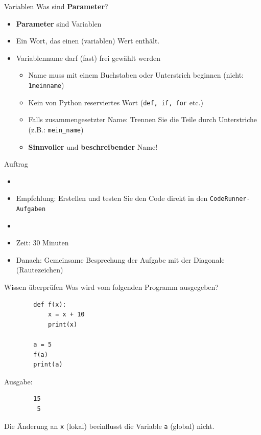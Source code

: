 \begin{frame}[fragile]{Variablen}
    Was sind \textbf{Parameter}?
    \begin{itemize}[<+->]
        \item \textbf{Parameter} sind Variablen
        \item Ein Wort, das einen  (variablen) Wert enthält.
        \item Variablenname darf (fast) frei gewählt werden
              \begin{itemize}
                  \item Name muss mit einem Buchstaben oder Unterstrich beginnen (nicht: \verb|1meinname|)
                  \item Kein von Python reserviertes Wort (\lstinline|def, if, for| etc.)
                  \item Falls zusammengesetzter Name: Trennen Sie die Teile durch Unterstriche (z.B.: \lstinline|mein_name|)
                  \item \textbf{Sinnvoller} und \textbf{beschreibender} Name!
              \end{itemize}
    \end{itemize}
\end{frame}

\begin{frame}[fragile]{Auftrag}%
    \begin{itemize}
        \item {}
        \item Empfehlung: Erstellen und testen Sie den Code direkt in den \texttt{CodeRunner-Aufgaben}
        \item {}
        \item Zeit: 30 Minuten
        \item Danach: Gemeinsame Besprechung der Aufgabe mit der Diagonale (Rautezeichen)
    \end{itemize}
\end{frame}

\begin{frame}[fragile]{Wissen überprüfen}
    Was wird vom folgenden Programm ausgegeben?
    \begin{lstlisting}
        def f(x):
            x = x + 10
            print(x)

        a = 5
        f(a)
        print(a)
    \end{lstlisting}
    \pause
    \vspace{0.3cm}
    Ausgabe:
    \begin{lstlisting}
        15
         5
    \end{lstlisting}
    Die Änderung an \lstinline{x} (lokal) beeinflusst die Variable \lstinline{a} (global) nicht.
\end{frame}